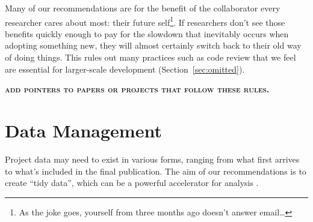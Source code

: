 \documentclass[10pt]{article}
\newcommand{\fixme}[1]{\textsc{\textbf{#1}}}
\begin{document}
Many of our recommendations are
for the benefit of the collaborator every researcher cares about most:
their future self\footnote{As the joke goes, yourself from three months ago doesn't
  answer email{\ldots}}. If researchers don't see those benefits
quickly enough to pay for the slowdown that inevitably occurs when
adopting something new, they will almost certainly switch
back to their old way of doing things.
This rules out many practices
such as code review that we feel are essential for larger-scale
development (Section~\ref{sec:omitted}).

\fixme{add pointers to papers or projects that follow these rules.}

\section{Data Management}\label{sec:data}

Project data may need to exist in various forms, ranging from what
first arrives to what's included in the final publication.  The aim
of our recommendations is to create ``tidy data'', which can be
a powerful accelerator for analysis \cite{wickham2014,hart2015}.
\end{document}

